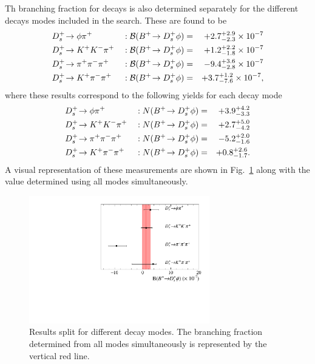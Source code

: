 {Th branching fraction for \decay{\Bp}{\Dsp\phiz} decays is also determined separately for the different \Dsp decays modes included in the search. These are found to be
\begin{equation}
  \left .
  \begin{aligned}
    &\decay{\Dsp}{\phiz\pip}      && : \BF(\decay{\Bp}{\Dsp\phiz}) = &+2.7^{+2.9}_{-2.3}\times 10^{-7}\\
    &\decay{\Dsp}{\Kp\Km\pip}     && : \BF(\decay{\Bp}{\Dsp\phiz}) = &+1.2^{+2.2}_{-1.8}\times 10^{-7}\\
    &\decay{\Dsp}{\pip\pim\pip}   && : \BF(\decay{\Bp}{\Dsp\phiz}) = &-9.4^{+3.6}_{-2.8}\times 10^{-7}\\
    &\decay{\Dsp}{\Kp\pim\pip}    && : \BF(\decay{\Bp}{\Dsp\phiz}) = &+3.7^{+1.2}_{-7.6}\times 10^{-7},\\
  \end{aligned} \right.
\end{equation} 
where these results correspond to the following yields for each \Dsp decay mode
\begin{equation}
  \left .
  \begin{aligned}
    &\decay{\Dsp}{\phiz\pip}      && : N(\decay{\Bp}{\Dsp\phiz}) = &+3.9^{+4.2}_{-3.3} \\
    &\decay{\Dsp}{\Kp\Km\pip}     && : N(\decay{\Bp}{\Dsp\phiz}) = &+2.7^{+5.0}_{-4.2} \\
    &\decay{\Dsp}{\pip\pim\pip}   && : N(\decay{\Bp}{\Dsp\phiz}) = &-5.2^{+2.0}_{-1.6} \\
    &\decay{\Dsp}{\Kp\pim\pip}    && : N(\decay{\Bp}{\Dsp\phiz}) = &+0.8^{+2.6}_{-1.7}. \\
  \end{aligned} \right.
\end{equation} 
A visual representation of these measurements are shown in Fig.~\ref{fig:B2DsPhi_split_Ds_results} along with the value determined using all modes simultaneously.

\begin{figure}[!h]
    \centering
        \includegraphics[width=0.7\textwidth]{figs/B2DsPhi/Split_Ds_modes.pdf}
        \caption{Results split for different \Dsp decay modes. The branching fraction determined from all modes simultaneously is represented by the vertical red line.}
    \label{fig:B2DsPhi_split_Ds_results}   
\end{figure}

}
